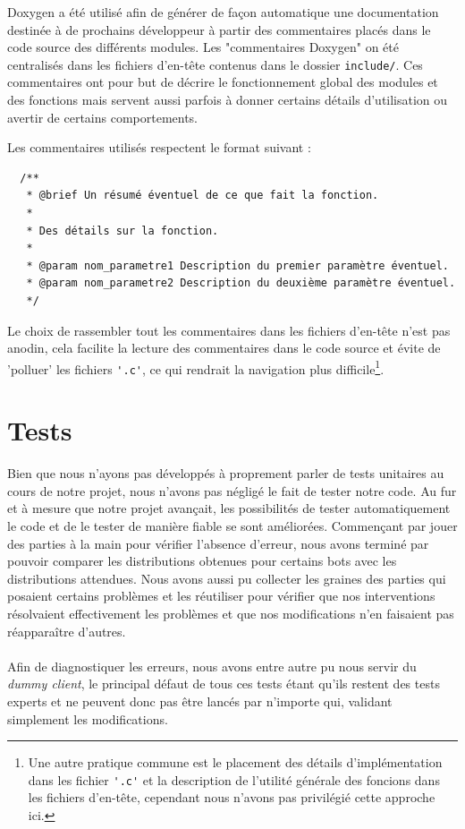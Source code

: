 \documentclass[a4paper,12pt]{article}
\begin{document}
Doxygen a été utilisé afin de générer de façon automatique une documentation
destinée à de prochains développeur à partir des commentaires placés dans le
code source des différents modules. Les "commentaires Doxygen" on été
centralisés dans les fichiers d'en-tête contenus dans le dossier
\verb!include/!. Ces commentaires ont pour but de décrire le fonctionnement
global des modules et des fonctions mais servent aussi parfois à donner
certains détails d'utilisation ou avertir de certains comportements.

Les commentaires utilisés respectent le format suivant :
\begin{verbatim}
  /**
   * @brief Un résumé éventuel de ce que fait la fonction.
   *
   * Des détails sur la fonction.
   *
   * @param nom_parametre1 Description du premier paramètre éventuel.
   * @param nom_parametre2 Description du deuxième paramètre éventuel.
   */
\end{verbatim}

Le choix de rassembler tout les commentaires dans les fichiers d'en-tête n'est
pas anodin, cela facilite la lecture des commentaires dans le code source et
évite de 'polluer' les fichiers \verb!'.c'!, ce qui rendrait la navigation
plus difficile\footnote{Une autre pratique commune est le placement des
détails d'implémentation dans les fichier \verb!'.c'! et la description de
l'utilité générale des foncions dans les fichiers d'en-tête, cependant nous
n'avons pas privilégié cette approche ici.}.

\section{Tests}
Bien que nous n'ayons pas développés à proprement parler de tests unitaires au
cours de notre projet, nous n'avons pas négligé le fait de tester notre code. Au
fur et à mesure que notre projet avançait, les possibilités de tester
automatiquement le code et de le tester de manière fiable se sont améliorées.
Commençant par jouer des parties à la main pour vérifier l'absence d'erreur,
nous avons terminé par pouvoir comparer les distributions obtenues pour certains
bots avec les distributions attendues. Nous avons aussi pu collecter les graines
des parties qui posaient certains problèmes et les réutiliser pour vérifier que
nos interventions résolvaient effectivement les problèmes et que nos
modifications n'en faisaient pas réapparaître d'autres.
\paragraph{}
Afin de diagnostiquer les erreurs, nous avons entre autre pu nous servir du
{\em dummy client}, le principal défaut de tous ces tests étant qu'ils restent
des tests experts et ne peuvent donc pas être lancés par n'importe qui, validant
simplement les modifications.
\end{document}
